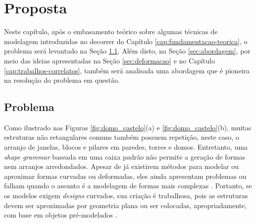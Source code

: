 \chapter{Proposta}
\label{chap:proposta}

Neste capítulo, após o embasamento teórico sobre algumas técnicas de modelagem introduzidas no decorrer do Capítulo \ref{cap:fundamentacao-teorica}, o problema será levantado na Seção \ref{sec:problema}. Além disto, na Seção \ref{sec:abordagem}, por meio das ideias apresentadas na Seção \ref{sec:deformacao} e no Capítulo \ref{cap:trabalhos-correlatos}, também será analisada uma abordagem que é pioneira na resolução do problema em questão.

\section{Problema}
\label{sec:problema}

Como ilustrado nas Figuras \ref{fig:domo_castelo}(a) e \ref{fig:domo_castelo}(b), muitas estruturas não retangulares comuns também possuem repetição, neste caso, o arranjo de janelas, blocos e pilares em paredes, torres e domos. Entretanto, uma \textit{shape grammar} baseada em uma caixa padrão não permite a geração de formas nem arranjos arredondados. Apesar de já existirem métodos para modelar ou aproximar formas curvadas ou deformadas, eles ainda apresentam problemas ou falham quando o assunto é a modelagem de formas mais complexas \cite{edelsbrunner2017}. Portanto, se os modelos exigem \textit{designs} curvados, sua criação é trabalhosa, pois as estruturas devem ser aproximadas por geometria plana ou ser colocadas, apropriadamente, com base em objetos pré-modelados \cite{zmugg2014}.

\begin{figure}[h!]
	\centering
	\captionsetup{width=15cm}
	{}	
\end{figure}

